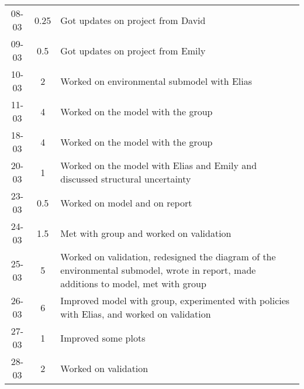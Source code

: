 \begin{longtable}[c]{c|c|m{35em}}
08-03 & 0.25 & Got updates on project from David \\
09-03 & 0.5 & Got updates on project from Emily \\
10-03 & 2 & Worked on environmental submodel with Elias \\
11-03 & 4 & Worked on the model with the group \\
18-03 & 4  & Worked on the model with the group \\
20-03 & 1 & Worked on the model with Elias and Emily and discussed structural uncertainty \\
23-03 & 0.5 & Worked on model and on report \\
24-03 & 1.5 & Met with group and worked on validation \\
25-03 & 5 & Worked on validation, redesigned the diagram of the environmental submodel, wrote in report, made additions to model, met with group \\
26-03 & 6 & Improved model with group, experimented with policies with Elias, and worked on validation \\
27-03 & 1 & Improved some plots \\
28-03 & 2 & Worked on validation
\end{longtable}

